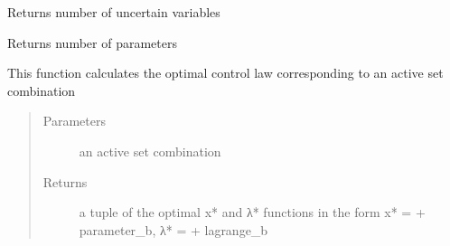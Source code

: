 \documentclass[letterpaper,10pt,english]{sphinxmanual}
\begin{document}
\begin{fulllineitems}

\begin{fulllineitems}
\label{\detokenize{ppopt:ppopt.mplp_program.MPLP_Program.num_t}}
\sphinxAtStartPar
Returns number of uncertain variables

\end{fulllineitems}


\begin{fulllineitems}
\label{\detokenize{ppopt:ppopt.mplp_program.MPLP_Program.num_x}}
\sphinxAtStartPar
Returns number of parameters

\end{fulllineitems}


\begin{fulllineitems}
\label{\detokenize{ppopt:ppopt.mplp_program.MPLP_Program.optimal_control_law}}
\sphinxAtStartPar
This function calculates the optimal control law corresponding to an active set combination
\begin{quote}\begin{description}
\item[{Parameters}] \leavevmode
\sphinxAtStartPar
{} \textendash{} an active set combination

\item[{Returns}] \leavevmode
\sphinxAtStartPar
a tuple of the optimal x* and λ* functions in the form x* =  + parameter\_b, λ* =  + lagrange\_b

\end{description}\end{quote}


\end{fulllineitems}
\end{fulllineitems}
\end{document}
